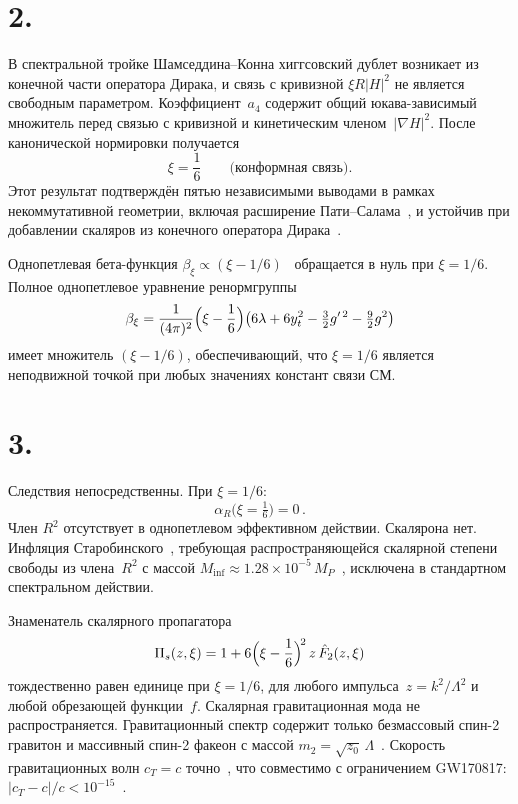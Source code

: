 \documentclass[twocolumn,10pt]{article}
\begin{document}
\section*{2.}
В спектральной тройке Шамседдина--Конна хиггсовский дублет
возникает из конечной части оператора Дирака, и связь с кривизной
$\xi R|H|^2$ не является свободным параметром. Коэффициент~$a_4$
содержит общий юкава-зависимый множитель перед связью с кривизной
и кинетическим членом~$|\nabla H|^2$. После канонической
нормировки получается~\cite{CCM:2006,CC:2010,CCS:2013,vS:2015,DLM:2014}
\begin{equation}\label{eq:xi}
  \xi = \frac{1}{6}\qquad\text{(конформная связь)}.
\end{equation}
Этот результат подтверждён пятью независимыми выводами в рамках
некоммутативной геометрии, включая расширение
Пати--Салама~\cite{CCS:2013ps}, и устойчив при добавлении
скаляров из конечного оператора Дирака~\cite{BFS:2010,vdD:2018}.

Однопетлевая бета-функция
$\beta_\xi \propto (\xi - 1/6)$~\cite{ParkerToms:2009}
обращается в нуль при $\xi = 1/6$. Полное однопетлевое уравнение
ренормгруппы~\cite{ParkerToms:2009,Buchbinder:1992}
\begin{equation}\label{eq:betaxi}
  \beta_\xi = \frac{1}{(4\pi)^2}\Bigl(\xi - \frac{1}{6}\Bigr)
  \bigl(6\lambda + 6y_t^2 - \tfrac{3}{2}g'^{\,2}
  - \tfrac{9}{2}g^2\bigr)
\end{equation}
имеет множитель $(\xi - 1/6)$, обеспечивающий, что $\xi = 1/6$
является неподвижной точкой при любых значениях констант связи СМ.

\section*{3.}
Следствия непосредственны. При $\xi = 1/6$:
\begin{equation}\label{eq:alphaR-zero}
  \alpha_R\bigl(\xi = \tfrac{1}{6}\bigr) = 0\,.
\end{equation}
Член $R^2$ отсутствует в однопетлевом эффективном действии.
Скалярона нет. Инфляция Старобинского~\cite{Starobinsky:1980},
требующая распространяющейся скалярной степени свободы из
члена~$R^2$ с массой $M_{\mathrm{inf}} \approx 1.28 \times
10^{-5}\,M_P$~\cite{Planck:2018}, исключена в стандартном
спектральном действии.

Знаменатель скалярного пропагатора
\begin{equation}\label{eq:Pis}
  \Pi_s(z, \xi) = 1 + 6\Bigl(\xi - \frac{1}{6}\Bigr)^{\!2}\,z\,
  \hat{F}_2(z, \xi)
\end{equation}
тождественно равен единице при $\xi = 1/6$, для любого
импульса~$z = k^2/\Lambda^2$ и любой обрезающей функции~$f$.
Скалярная гравитационная мода не распространяется.
Гравитационный спектр содержит только безмассовый спин-2
гравитон и массивный спин-2 факеон с массой
$m_2 = \sqrt{z_0}\,\Lambda$~\cite{Alfyorov:2026paper1}.
Скорость гравитационных волн $c_T = c$
точно~\cite{Alfyorov:2026paper4}, что совместимо с ограничением
GW170817: $|c_T - c|/c < 10^{-15}$~\cite{GW170817:2017}.
\end{document}
